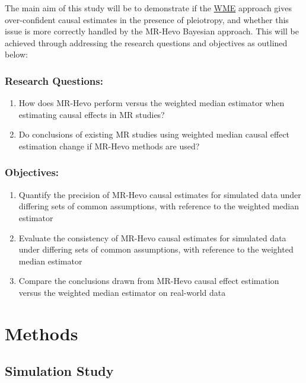 \documentclass[
]{article}
\providecommand{\tightlist}{%
  \setlength{\itemsep}{0pt}\setlength{\parskip}{0pt}}
\begin{document}
The main aim of this study will be to demonstrate if the \hyperref[acronyms_WME]{WME} approach gives over-confident causal estimates in the presence of pleiotropy, and whether this issue is more correctly handled by the MR-Hevo Bayesian approach. This will be achieved through addressing the research questions and objectives as outlined below:

\subsubsection{Research Questions:}\label{research-questions}

\begin{enumerate}
\def\labelenumi{\arabic{enumi}.}
\tightlist
\item
  How does MR-Hevo perform versus the weighted median estimator when estimating causal effects in MR studies?
\item
  Do conclusions of existing MR studies using weighted median causal effect estimation change if MR-Hevo methods are used?
\end{enumerate}

\subsubsection{Objectives:}\label{objectives}

\begin{enumerate}
\def\labelenumi{\arabic{enumi}.}
\tightlist
\item
  Quantify the precision of MR-Hevo causal estimates for simulated data under differing sets of common assumptions, with reference to the weighted median estimator
\item
  Evaluate the consistency of MR-Hevo causal estimates for simulated data under differing sets of common assumptions, with reference to the weighted median estimator
\item
  Compare the conclusions drawn from MR-Hevo causal effect estimation versus the weighted median estimator on real-world data
\end{enumerate}

\newpage

\section{Methods}\label{methods}

\subsection{Simulation Study}\label{simulation-study}
\end{document}
